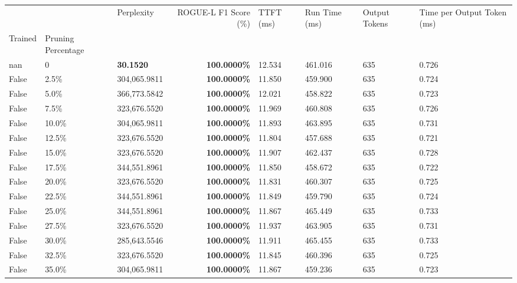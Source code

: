 \begin{table}[H]
\label{tab:evaluation-pipeline-9-untrained}
\begin{tabular}{lllrllll}
\toprule
 &  & Perplexity & ROGUE-L F1 Score (\%) & TTFT (ms) & Run Time (ms) & Output Tokens & Time per Output Token (ms) \\
Trained & Pruning Percentage &  &  &  &  &  &  \\
\midrule
nan & 0 & \bfseries 30.1520 & \bfseries 100.0000\% & 12.534 & 461.016 & 635 & 0.726 \\
\cline{1-8}
False & 2.5\% & 304,065.9811 & \bfseries \color{red} 100.0000\% & 11.850 & 459.900 & 635 & 0.724 \\
\cline{1-8}
False & 5.0\% & 366,773.5842 & \bfseries \color{red} 100.0000\% & 12.021 & 458.822 & 635 & 0.723 \\
\cline{1-8}
False & 7.5\% & 323,676.5520 & \bfseries \color{red} 100.0000\% & 11.969 & 460.808 & 635 & 0.726 \\
\cline{1-8}
False & 10.0\% & 304,065.9811 & \bfseries \color{red} 100.0000\% & 11.893 & 463.895 & 635 & 0.731 \\
\cline{1-8}
False & 12.5\% & 323,676.5520 & \bfseries \color{red} 100.0000\% & 11.804 & 457.688 & 635 & 0.721 \\
\cline{1-8}
False & 15.0\% & 323,676.5520 & \bfseries \color{red} 100.0000\% & 11.907 & 462.437 & 635 & 0.728 \\
\cline{1-8}
False & 17.5\% & 344,551.8961 & \bfseries \color{red} 100.0000\% & 11.850 & 458.672 & 635 & 0.722 \\
\cline{1-8}
False & 20.0\% & 323,676.5520 & \bfseries \color{red} 100.0000\% & 11.831 & 460.307 & 635 & 0.725 \\
\cline{1-8}
False & 22.5\% & 344,551.8961 & \bfseries \color{red} 100.0000\% & 11.849 & 459.790 & 635 & 0.724 \\
\cline{1-8}
False & 25.0\% & 344,551.8961 & \bfseries \color{red} 100.0000\% & 11.867 & 465.449 & 635 & 0.733 \\
\cline{1-8}
False & 27.5\% & 323,676.5520 & \bfseries \color{red} 100.0000\% & 11.937 & 463.905 & 635 & 0.731 \\
\cline{1-8}
False & 30.0\% & \color{red} 285,643.5546 & \bfseries \color{red} 100.0000\% & 11.911 & 465.455 & 635 & 0.733 \\
\cline{1-8}
False & 32.5\% & 323,676.5520 & \bfseries \color{red} 100.0000\% & 11.845 & 460.396 & 635 & 0.725 \\
\cline{1-8}
False & 35.0\% & 304,065.9811 & \bfseries \color{red} 100.0000\% & 11.867 & 459.236 & 635 & 0.723 \\

\end{tabular}
\end{table}
